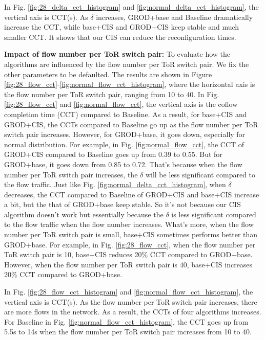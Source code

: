 In Fig. \ref{fig:28_delta_cct_histogram} and \ref{fig:normal_delta_cct_histogram}, the vertical axis is CCT(s). As $\delta$ increases, GROD+base and Baseline dramatically increase the CCT, while base+CIS and GROD+CIS keep stable and much smaller CCT. It shows that our CIS can reduce the reconfiguration times.


\textbf{Impact of flow number per ToR switch pair:}
To evaluate how the algorithms are influenced by the flow number per ToR switch pair. We fix the other parameters to be defaulted. The results are shown in Figure \ref{fig:28_flow_cct}-\ref{fig:normal_flow_cct_histogram}, where the horizontal axis is the flow number per ToR switch pair, ranging from 10 to 40. In Fig. \ref{fig:28_flow_cct} and \ref{fig:normal_flow_cct}, the vertical axis is the coflow completion time (CCT) compared to Baseline. As a result, for base+CIS and GROD+CIS, the CCTs compared to Baseline go up as the flow number per ToR switch pair increases. However, for GROD+base, it goes down, especially for normal distribution. For example, in Fig. \ref{fig:normal_flow_cct}, the CCT of GROD+CIS compared to Baseline goes up from 0.39 to 0.55. But for GROD+base, it goes down from 0.85 to 0.72. That's because when the flow number per ToR switch pair increases, the $\delta$ will be less significant compared to the flow traffic. Just like Fig. \ref{fig:normal_delta_cct_histogram}, when $\delta$ decreases, the CCT compared to Baseline of GROD+CIS and base+CIS increase a bit, but the that of GROD+base keep stable. So it's not because our CIS algorithm doesn't work but essentially because the $\delta$ is less significant compared to the flow traffic when the flow number increases. What's more, when the flow number per ToR switch pair is small, base+CIS sometimes performs better than GROD+base. For example, in Fig. \ref{fig:28_flow_cct}, when the flow number per ToR switch pair is 10, base+CIS reduces 20\% CCT compared to GROD+base. However, when the flow number per ToR switch pair is 40, base+CIS increases 20\% CCT compared to GROD+base. %

In Fig. \ref{fig:28_flow_cct_histogram} and \ref{fig:normal_flow_cct_histogram}, the vertical axis is CCT(s). As the flow number per ToR switch pair increases, there are more flows in the network. As a result, the CCTs of four algorithms increases. For Baseline in Fig. \ref{fig:normal_flow_cct_histogram}, the CCT goes up from 5.5s to 14s when  the flow number per ToR switch pair increases from 10 to 40.

